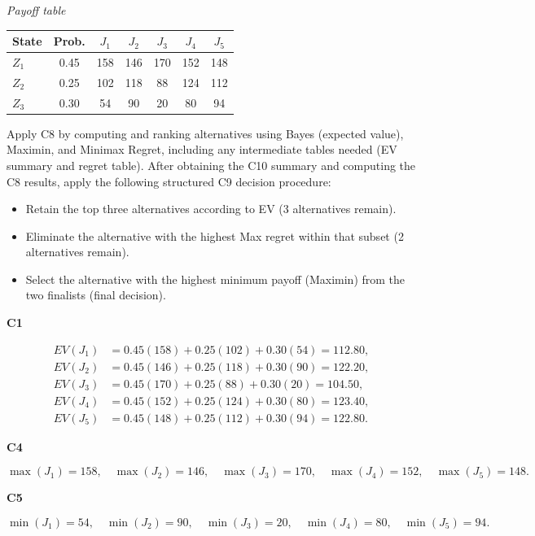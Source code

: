 \begin{ExamProblems}
		\begin{center}
			\textit{Payoff table} \\
			\begin{tabular}{l c c c c c c}
				\hline
				State& Prob. & $J_1$ & $J_2$ & $J_3$ & $J_4$ & $J_5$ \\
				\hline
				$Z_1$ & 0.45 & 158 & 146 & 170 & 152 & 148 \\
				$Z_2$ & 0.25 & 102 & 118 & 88 & 124 & 112 \\
				$Z_3$ & 0.30 & 54 & 90 & 20 & 80 & 94 \\
				\hline
			\end{tabular}
		\end{center}
		
		Apply C8 by computing and ranking alternatives using Bayes (expected value), Maximin, and Minimax Regret, including any intermediate tables needed (EV summary and regret table).
		After obtaining the C10 summary and computing the C8 results, apply the following structured C9 decision procedure:
		\begin{itemize}
			\item Retain the top three alternatives according to EV (3 alternatives remain).
			\item Eliminate the alternative with the highest Max regret within that subset (2 alternatives remain).
			\item Select the alternative with the highest minimum payoff (Maximin) from the two finalists (final decision).
		\end{itemize}
		
		\vspace{0.25cm}
		
		\textbf{C1}\par
				\[
		\begin{aligned}
			EV(J_1)&=0.45(158)+0.25(102)+0.30(54)=112.80,\\
			EV(J_2)&=0.45(146)+0.25(118)+0.30(90)=122.20,\\
			EV(J_3)&=0.45(170)+0.25(88)+0.30(20)=104.50,\\
			EV(J_4)&=0.45(152)+0.25(124)+0.30(80)=123.40,\\
			EV(J_5)&=0.45(148)+0.25(112)+0.30(94)=122.80.
		\end{aligned}
		\]
		

		\textbf{C4}\par
				\[
		\max(J_1)=158,\quad \max(J_2)=146,\quad \max(J_3)=170,\quad \max(J_4)=152,\quad \max(J_5)=148.
		\]
		

		\textbf{C5}\par
				\[
		\min(J_1)=54,\quad \min(J_2)=90,\quad \min(J_3)=20,\quad \min(J_4)=80,\quad \min(J_5)=94.
		\]
		



\end{ExamProblems}
